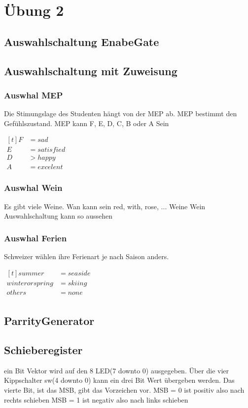 \section{Übung 2}
\subsection{Auswahlschaltung EnabeGate}

\subsection{Auswahlschaltung mit Zuweisung}
\subsubsection{Auswhal MEP}
Die Stimungslage des Studenten hängt von der MEP ab.
MEP bestimmt den Gefühlszustand.
MEP kann F, E, D, C, B oder A Sein

$\begin{aligned}[t]
    F &= sad \\
    E &= satisfied\\
    D &> happy \\
    A &= excelent
\end{aligned}$

\subsubsection{Auswhal Wein}
Es gibt viele Weine.
Wan kann sein red, with, rose, ...
Weine Wein Auswahlschaltung kann so aussehen 

\subsubsection{Auswhal Ferien}
Schweizer wählen ihre Ferienart je nach Saison anders.
 
$\begin{aligned}[t]
    summer &= seaside \\
    winter or spring &= skiing\\
    others &= none \\
\end{aligned}$

\subsection{ParrityGenerator}

\subsection{Schieberegister}
ein Bit Vektor wird auf den 8 LED(7 downto 0) ausgegeben. Über die vier Kippschalter sw(4 downto 0) kann ein drei Bit Wert übergeben werden. Das vierte Bit, ist das MSB, gibt das Vorzeichen vor.
MSB = 0 ist positiv also nach rechts schieben
MSB = 1 ist negativ also nach links schieben


